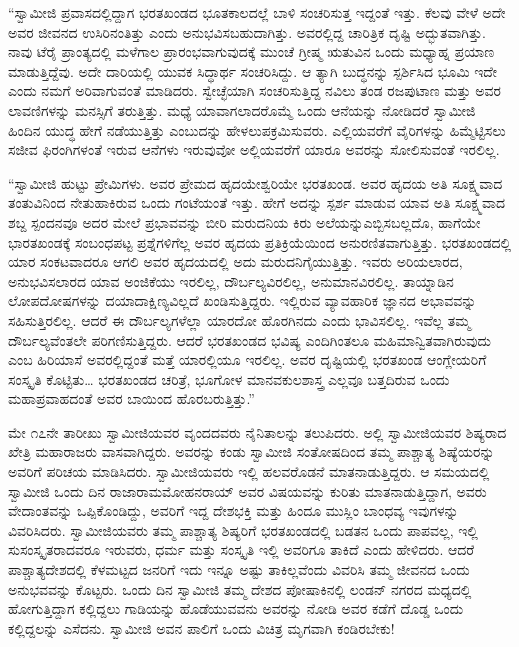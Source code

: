  “ಸ್ವಾಮೀಜಿ ಪ್ರವಾಸದಲ್ಲಿದ್ದಾಗ ಭರತಖಂಡದ ಭೂತಕಾಲದಲ್ಲೆ ಬಾಳಿ ಸಂಚರಿಸುತ್ತ ಇದ್ದಂತೆ ಇತ್ತು. ಕೆಲವು ವೇಳೆ ಅದೇ ಅವರ ಜೀವನದ ಉಸಿರಿನಂತಿತ್ತು ಎಂದು ಅನುಭವಿಸಬಹುದಾಗಿತ್ತು. ಅವರಲ್ಲಿದ್ದ ಚಾರಿತ್ರಿಕ ದೃಷ್ಟಿ ಅದ್ಭುತವಾಗಿತ್ತು. ನಾವು ಟೆರೈ ಪ್ರಾಂತ್ಯದಲ್ಲಿ ಮಳೆಗಾಲ ಪ್ರಾರಂಭವಾಗುವುದಕ್ಕೆ ಮುಂಚೆ ಗ್ರೀಷ್ಮ ಋತುವಿನ ಒಂದು ಮಧ್ಯಾಹ್ನ ಪ್ರಯಾಣ ಮಾಡುತ್ತಿದ್ದೆವು. ಅದೇ ದಾರಿಯಲ್ಲಿ ಯುವಕ ಸಿದ್ಧಾರ್ಥ ಸಂಚರಿಸಿದ್ದು. ಆ ತ್ಯಾಗಿ ಬುದ್ಧನನ್ನು ಸ್ಪರ್ಶಿಸಿದ ಭೂಮಿ ಇದೇ ಎಂದು ನಮಗೆ ಅರಿವಾಗುವಂತೆ ಮಾಡಿದರು. ಸ್ವೇಚ್ಛೆಯಾಗಿ ಸಂಚರಿಸುತ್ತಿದ್ದ ನವಿಲು ತಂಡ ರಜಪುಟಾಣ ಮತ್ತು ಅವರ ಲಾವಣಿಗಳನ್ನು ಮನಸ್ಸಿಗೆ ತರುತ್ತಿತ್ತು. ಮಧ್ಯೆ ಯಾವಾಗಲಾದರೊಮ್ಮೆ ಒಂದು ಆನೆಯನ್ನು ನೋಡಿದರೆ ಸ್ವಾಮೀಜಿ ಹಿಂದಿನ ಯುದ್ಧ ಹೇಗೆ ನಡೆಯುತ್ತಿತ್ತು ಎಂಬುದನ್ನು ಹೇಳಲುಪಕ್ರಮಿಸುವರು. ಎಲ್ಲಿಯವರೆಗೆ ವೈರಿಗಳನ್ನು ಹಿಮ್ಮೆಟ್ಟಿಸಲು ಸಜೀವ ಫಿರಂಗಿಗಳಂತೆ ಇರುವ ಆನೆಗಳು ಇರುವುವೋ ಅಲ್ಲಿಯವರೆಗೆ ಯಾರೂ ಅವರನ್ನು ಸೋಲಿಸುವಂತೆ ಇರಲಿಲ್ಲ. 

 “ಸ್ವಾಮೀಜಿ ಹುಟ್ಟು ಪ್ರೇಮಿಗಳು. ಅವರ ಪ್ರೇಮದ ಹೃದಯೇಶ್ವರಿಯೇ ಭರತಖಂಡ. ಅವರ ಹೃದಯ ಅತಿ ಸೂಕ್ಷ್ಮವಾದ ತಂತುವಿನಿಂದ ನೇತುಹಾಕಿರುವ ಒಂದು ಗಂಟೆಯಂತೆ ಇತ್ತು. ಹೇಗೆ ಅದನ್ನು ಸ್ಪರ್ಶ ಮಾಡುವ ಯಾವ ಅತಿ ಸೂಕ್ಷ್ಮವಾದ ಶಬ್ದ ಸ್ಪಂದನವೂ ಅದರ ಮೇಲೆ ಪ್ರಭಾವವನ್ನು ಬೀರಿ ಮರುದನಿಯ ಕಿರು ಅಲೆಯನ್ನು\break ಎಬ್ಬಿಸಬಲ್ಲದೊ, ಹಾಗೆಯೇ ಭಾರತಖಂಡಕ್ಕೆ ಸಂಬಂಧಪಟ್ಟ ಪ್ರಶ್ನೆಗಳಿಗೆಲ್ಲ ಅವರ ಹೃದಯ ಪ್ರತಿಕ್ರಿಯೆಯಿಂದ ಅನುರಣಿತವಾಗುತ್ತಿತ್ತು. ಭರತಖಂಡದಲ್ಲಿ ಯಾರ ಸಂಕಟವಾದರೂ ಆಗಲಿ ಅವರ ಹೃದಯದಲ್ಲಿ ಅದು ಮರುದನಿಗೈಯುತ್ತಿತ್ತು. ಇವರು ಅರಿಯಲಾರದ, ಅನುಭವಿಸಲಾರದ ಯಾವ ಅಂಜಿಕೆಯು ಇರಲಿಲ್ಲ, ದೌರ್ಬಲ್ಯವಿರಲಿಲ್ಲ, ಅನುಮಾನವಿರಲಿಲ್ಲ. ತಾಯ್ನಾಡಿನ ಲೋಪದೋಷಗಳನ್ನು ದಯಾದಾಕ್ಷಿಣ್ಯವಿಲ್ಲದೆ ಖಂಡಿಸುತ್ತಿದ್ದರು. ಇಲ್ಲಿರುವ ವ್ಯಾವಹಾರಿಕ ಜ್ಞಾನದ ಅಭಾವವನ್ನು ಸಹಿಸುತ್ತಿರಲಿಲ್ಲ. ಆದರೆ ಈ ದೌರ್ಬಲ್ಯಗಳೆಲ್ಲಾ ಯಾರದೋ ಹೊರಗಿನದು ಎಂದು ಭಾವಿಸಲಿಲ್ಲ. ಇವೆಲ್ಲ ತಮ್ಮ ದೌರ್ಬಲ್ಯವೆಂತಲೇ ಪರಿಗಣಿಸುತ್ತಿದ್ದರು. ಆದರೆ ಭರತಖಂಡದ ಭವಿಷ್ಯ ಎಂದಿಗಿಂತಲೂ ಮಹಿಮಾನ್ವಿತವಾಗಿರುವುದು ಎಂಬ ಹಿರಿಯಾಸೆ ಅವರಲ್ಲಿದ್ದಂತೆ ಮತ್ತೆ ಯಾರಲ್ಲಿಯೂ ಇರಲಿಲ್ಲ. ಅವರ ದೃಷ್ಟಿಯಲ್ಲಿ ಭರತಖಂಡ ಆಂಗ್ಲೇಯರಿಗೆ ಸಂಸ್ಕೃತಿ ಕೊಟ್ಟಿತು… ಭರತಖಂಡದ ಚರಿತ್ರೆ, ಭೂಗೋಳ ಮಾನವಕುಲಶಾಸ್ತ್ರ ಎಲ್ಲವೂ ಬತ್ತದಿರುವ ಒಂದು ಮಹಾಪ್ರವಾಹದಂತೆ ಅವರ ಬಾಯಿಂದ ಹೊರಬರುತ್ತಿತ್ತು.” 

\vskip 2pt

 ಮೇ ೧೭ನೇ ತಾರೀಖು ಸ್ವಾಮೀಜಿಯವರ ವೃಂದದವರು ನೈನಿತಾಲನ್ನು ತಲುಪಿದರು. ಅಲ್ಲಿ ಸ್ವಾಮೀಜಿಯವರ ಶಿಷ್ಯರಾದ ಖೇತ್ರಿ ಮಹಾರಾಜರು ವಾಸವಾಗಿದ್ದರು. ಅವರನ್ನು ಕಂಡು ಸ್ವಾಮೀಜಿ ಸಂತೋಷದಿಂದ ತಮ್ಮ ಪಾಶ್ಚಾತ್ಯ ಶಿಷ್ಯೆಯರನ್ನು ಅವರಿಗೆ ಪರಿಚಯ ಮಾಡಿಸಿದರು. ಸ್ವಾಮೀಜಿಯವರು ಇಲ್ಲಿ ಹಲವರೊಡನೆ ಮಾತನಾಡುತ್ತಿದ್ದರು. ಆ ಸಮಯದಲ್ಲಿ ಸ್ವಾಮೀಜಿ ಒಂದು ದಿನ ರಾಜಾರಾಮಮೋಹನರಾಯ್ ಅವರ ವಿಷಯವನ್ನು ಕುರಿತು ಮಾತನಾಡುತ್ತಿದ್ದಾಗ, ಅವರು ವೇದಾಂತವನ್ನು ಒಪ್ಪಿಕೊಂಡಿದ್ದು, ಅವರಿಗೆ ಇದ್ದ ದೇಶಭಕ್ತಿ ಮತ್ತು ಹಿಂದೂ ಮುಸ್ಲಿಂ ಬಾಂಧವ್ಯ ಇವುಗಳನ್ನು ವಿವರಿಸಿದರು. ಸ್ವಾಮೀಜಿಯವರು ತಮ್ಮ ಪಾಶ್ಚಾತ್ಯ ಶಿಷ್ಯರಿಗೆ ಭರತಖಂಡದಲ್ಲಿ ಬಡತನ ಒಂದು ಪಾಪವಲ್ಲ, ಇಲ್ಲಿ ಸುಸಂಸ್ಕೃತರಾದವರೂ ಇರುವರು, ಧರ್ಮ ಮತ್ತು ಸಂಸ್ಕೃತಿ ಇಲ್ಲಿ ಅವರಿಗೂ ತಾಕಿದೆ ಎಂದು ಹೇಳಿದರು. ಆದರೆ ಪಾಶ್ಚಾತ್ಯದೇಶದಲ್ಲಿ ಕೆಳಮಟ್ಟದ ಜನರಿಗೆ ಇದು ಇನ್ನೂ ಅಷ್ಟು ತಾಕಿಲ್ಲವೆಂದು ವಿವರಿಸಿ ತಮ್ಮ ಜೀವನದ ಒಂದು ಅನುಭವವನ್ನು ಕೊಟ್ಟರು. ಒಂದು ದಿನ ಸ್ವಾಮೀಜಿ ತಮ್ಮ ದೇಶದ ಪೋಷಾಕಿನಲ್ಲಿ ಲಂಡನ್ ನಗರದ ಮಧ್ಯದಲ್ಲಿ ಹೋಗುತ್ತಿದ್ದಾಗ ಕಲ್ಲಿದ್ದಲು ಗಾಡಿಯನ್ನು ಹೊಡೆಯುವವನು ಅವರನ್ನು ನೋಡಿ ಅವರ ಕಡೆಗೆ ದೊಡ್ಡ ಒಂದು ಕಲ್ಲಿದ್ದಲನ್ನು ಎಸೆದನು. ಸ್ವಾಮೀಜಿ ಅವನ ಪಾಲಿಗೆ ಒಂದು ವಿಚಿತ್ರ ಮೃಗವಾಗಿ ಕಂಡಿರಬೇಕು! 

